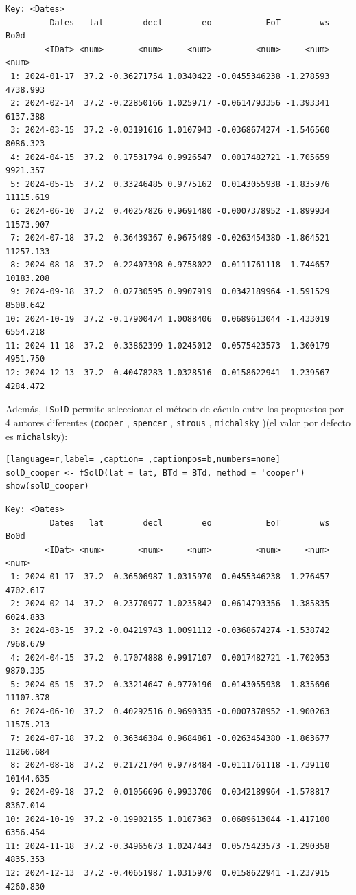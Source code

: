 \begin{verbatim}
Key: <Dates>
         Dates   lat        decl        eo           EoT        ws      Bo0d
        <IDat> <num>       <num>     <num>         <num>     <num>     <num>
 1: 2024-01-17  37.2 -0.36271754 1.0340422 -0.0455346238 -1.278593  4738.993
 2: 2024-02-14  37.2 -0.22850166 1.0259717 -0.0614793356 -1.393341  6137.388
 3: 2024-03-15  37.2 -0.03191616 1.0107943 -0.0368674274 -1.546560  8086.323
 4: 2024-04-15  37.2  0.17531794 0.9926547  0.0017482721 -1.705659  9921.357
 5: 2024-05-15  37.2  0.33246485 0.9775162  0.0143055938 -1.835976 11115.619
 6: 2024-06-10  37.2  0.40257826 0.9691480 -0.0007378952 -1.899934 11573.907
 7: 2024-07-18  37.2  0.36439367 0.9675489 -0.0263454380 -1.864521 11257.133
 8: 2024-08-18  37.2  0.22407398 0.9758022 -0.0111761118 -1.744657 10183.208
 9: 2024-09-18  37.2  0.02730595 0.9907919  0.0342189964 -1.591529  8508.642
10: 2024-10-19  37.2 -0.17900474 1.0088406  0.0689613044 -1.433019  6554.218
11: 2024-11-18  37.2 -0.33862399 1.0245012  0.0575423573 -1.300179  4951.750
12: 2024-12-13  37.2 -0.40478283 1.0328516  0.0158622941 -1.239567  4284.472
\end{verbatim}

Además, \texttt{fSolD} permite seleccionar el método de cáculo entre los propuestos por 4 autores diferentes (\texttt{cooper} \cite{Cooper1969}, \texttt{spencer} \cite{Spencer1971}, \texttt{strous} \cite{Strous2011}, \texttt{michalsky} \cite{Michalsky1988})(el valor por defecto es \texttt{michalsky}):
\begin{lstlisting}[language=r,label= ,caption= ,captionpos=b,numbers=none]
solD_cooper <- fSolD(lat = lat, BTd = BTd, method = 'cooper')
show(solD_cooper)
\end{lstlisting}

\begin{verbatim}
Key: <Dates>
         Dates   lat        decl        eo           EoT        ws      Bo0d
        <IDat> <num>       <num>     <num>         <num>     <num>     <num>
 1: 2024-01-17  37.2 -0.36506987 1.0315970 -0.0455346238 -1.276457  4702.617
 2: 2024-02-14  37.2 -0.23770977 1.0235842 -0.0614793356 -1.385835  6024.833
 3: 2024-03-15  37.2 -0.04219743 1.0091112 -0.0368674274 -1.538742  7968.679
 4: 2024-04-15  37.2  0.17074888 0.9917107  0.0017482721 -1.702053  9870.335
 5: 2024-05-15  37.2  0.33214647 0.9770196  0.0143055938 -1.835696 11107.378
 6: 2024-06-10  37.2  0.40292516 0.9690335 -0.0007378952 -1.900263 11575.213
 7: 2024-07-18  37.2  0.36346384 0.9684861 -0.0263454380 -1.863677 11260.684
 8: 2024-08-18  37.2  0.21721704 0.9778484 -0.0111761118 -1.739110 10144.635
 9: 2024-09-18  37.2  0.01056696 0.9933706  0.0342189964 -1.578817  8367.014
10: 2024-10-19  37.2 -0.19902155 1.0107363  0.0689613044 -1.417100  6356.454
11: 2024-11-18  37.2 -0.34965673 1.0247443  0.0575423573 -1.290358  4835.353
12: 2024-12-13  37.2 -0.40651987 1.0315970  0.0158622941 -1.237915  4260.830
\end{verbatim}

